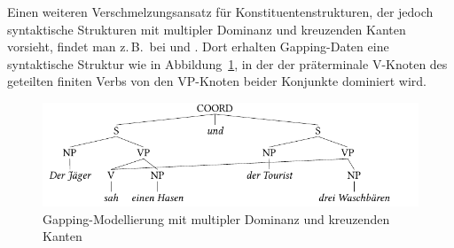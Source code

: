 Einen weiteren Verschmelzungsansatz für Konstituentenstrukturen, der jedoch syntaktische Strukturen mit multipler Dominanz und kreuzenden Kanten vorsieht, findet man z.\,B.\ bei \cite{McCawley:82} und \cite{Wilder:99,Wilder:08}. Dort erhalten Gapping-Daten eine syntaktische Struktur wie in Abbildung~\ref{fig-ellipse-verschmelzung}, in der der präterminale V-Knoten des geteilten finiten Verbs von den VP-Knoten beider Konjunkte dominiert wird.   
\begin{figure}[t]
\centering
\includegraphics{graphics/abb82.pdf}
\caption{\label{fig-ellipse-verschmelzung}Gapping-Modellierung mit multipler Dominanz und kreuzenden Kanten}
\end{figure}
 
